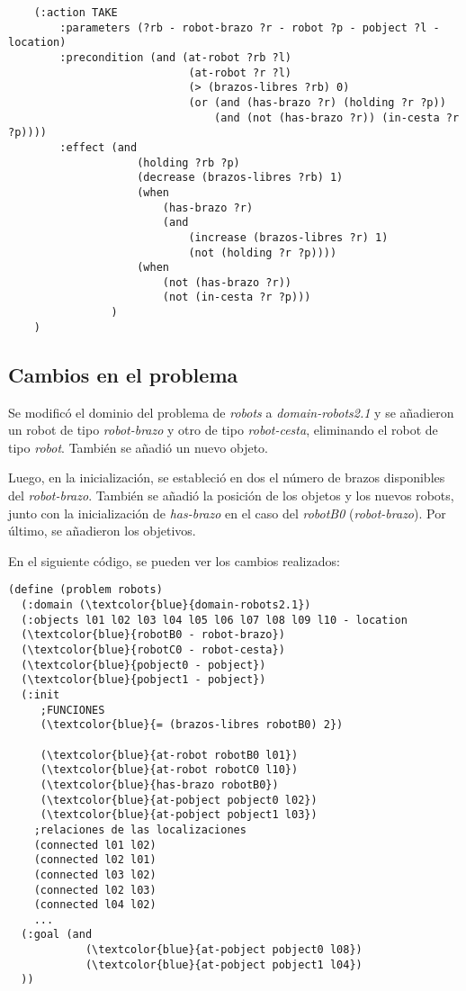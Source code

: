 \documentclass{article}
\begin{document}
\begin{itemize}
    \begin{verbatim}
    (:action TAKE
        :parameters (?rb - robot-brazo ?r - robot ?p - pobject ?l - location)
        :precondition (and (at-robot ?rb ?l)
                            (at-robot ?r ?l)
                            (> (brazos-libres ?rb) 0)
                            (or (and (has-brazo ?r) (holding ?r ?p))
                                (and (not (has-brazo ?r)) (in-cesta ?r ?p))))
        :effect (and
                    (holding ?rb ?p)
                    (decrease (brazos-libres ?rb) 1)
                    (when
                        (has-brazo ?r)
                        (and
                            (increase (brazos-libres ?r) 1)
                            (not (holding ?r ?p))))
                    (when
                        (not (has-brazo ?r))
                        (not (in-cesta ?r ?p)))
                )
    )
    \end{verbatim}
\end{itemize}



\subsection{Cambios en el problema}
Se modificó el dominio del problema de \textit{robots} a \textit{domain-robots2.1} y se añadieron un robot de tipo \textit{robot-brazo} 
y otro de tipo \textit{robot-cesta}, eliminando el robot de tipo \textit{robot}. También se añadió un nuevo objeto. 

Luego, en la inicialización, se estableció en dos el número de brazos disponibles del \textit{robot-brazo}. También se añadió la posición de los objetos 
y los nuevos robots, junto con la inicialización de \textit{has-brazo} en el caso del \textit{robotB0} (\textit{robot-brazo}). 
Por último, se añadieron los objetivos. 

En el siguiente código, se pueden ver los cambios realizados:

\begin{Verbatim}[commandchars=\\\{\}]
(define (problem robots)
  (:domain (\textcolor{blue}{domain-robots2.1})
  (:objects l01 l02 l03 l04 l05 l06 l07 l08 l09 l10 - location
  (\textcolor{blue}{robotB0 - robot-brazo})
  (\textcolor{blue}{robotC0 - robot-cesta})
  (\textcolor{blue}{pobject0 - pobject})
  (\textcolor{blue}{pobject1 - pobject})
  (:init
     ;FUNCIONES
     (\textcolor{blue}{= (brazos-libres robotB0) 2})

     (\textcolor{blue}{at-robot robotB0 l01})
     (\textcolor{blue}{at-robot robotC0 l10})
     (\textcolor{blue}{has-brazo robotB0})
     (\textcolor{blue}{at-pobject pobject0 l02})
     (\textcolor{blue}{at-pobject pobject1 l03})
    ;relaciones de las localizaciones
    (connected l01 l02)
    (connected l02 l01)
    (connected l03 l02)
    (connected l02 l03)
    (connected l04 l02)
    ...
  (:goal (and
            (\textcolor{blue}{at-pobject pobject0 l08})
            (\textcolor{blue}{at-pobject pobject1 l04})
  ))
\end{Verbatim}
\end{document}
